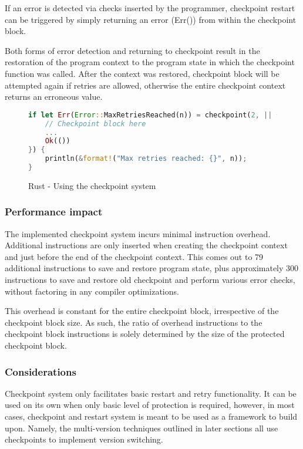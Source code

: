 If an error is detected via checks inserted by the programmer, checkpoint restart can be triggered by simply returning an error (Err()) from within the checkpoint block.

Both forms of error detection and returning to checkpoint result in the restoration of the program context to the program state in which the checkpoint function was called. After the context was restored, checkpoint block will be attempted again if retries are allowed, otherwise the entire checkpoint context returns an erroneous value.

\begin{figure}[!h]
\begin{lstlisting}[language=Rust]
if let Err(Error::MaxRetriesReached(n)) = checkpoint(2, || {
    // Checkpoint block here
    ...
    Ok(())
}) {
    println(&format!("Max retries reached: {}", n));
}
\end{lstlisting}
\caption{Rust - Using the checkpoint system}
\label{fig:rust_using_checkpoint}
\end{figure}

\subsubsection{Performance impact}

The implemented checkpoint system incurs minimal instruction overhead. Additional instructions are only inserted when creating the checkpoint context and just before the end of the checkpoint context. This comes out to 79 additional instructions to save and restore program state, plus approximately 300 instructions to save and restore old checkpoint and perform various error checks, without factoring in any compiler optimizations.

This overhead is constant for the entire checkpoint block, irrespective of the checkpoint block size. As such, the ratio of overhead instructions to the checkpoint block instructions is solely determined by the size of the protected checkpoint block.

\subsubsection{Considerations}

Checkpoint system only facilitates basic restart and retry functionality. It can be used on its own when only basic level of protection is required, however, in most cases, checkpoint and restart system is meant to be used as a framework to build upon. Namely, the multi-version techniques outlined in later sections all use checkpoints to implement version switching.

